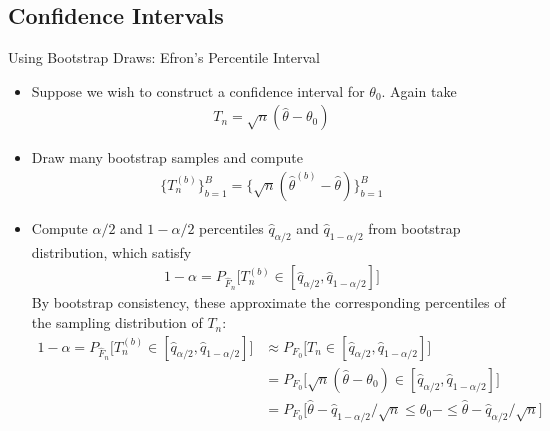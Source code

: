 \documentclass[aspectratio=169, handout]{beamer}
\begin{document}
\subsection{Confidence Intervals}


{\scriptsize
\begin{frame}{Using Bootstrap Draws: Efron's Percentile Interval}
\begin{itemize}
  \item
    Suppose we wish to construct a confidence interval for $\theta_0$.
    Again take
    \begin{align*}
      T_n = \sqrt{n}(\hat{\theta}-\theta_0)
    \end{align*}

  \item Draw many bootstrap samples and compute
    \begin{align*}
      \big\{T^{(b)}_n\big\}_{b=1}^B
      =
      \big\{\sqrt{n}(\hat{\theta}^{(b)}-\hat{\theta})\}_{b=1}^B
    \end{align*}
  \item Compute $\alpha/2$ and $1-\alpha/2$ percentiles
    $\hat{q}_{\alpha/2}$ and $\hat{q}_{1-\alpha/2}$ from bootstrap
    distribution, which satisfy
    \begin{align*}
      1-\alpha
      =
      P_{\hat{F}_n}
      \bigg[
        T_n^{(b)}\in [\hat{q}_{\alpha/2},\hat{q}_{1-\alpha/2}]
      \bigg]
    \end{align*}
    By bootstrap consistency, these approximate the corresponding
    percentiles of the sampling distribution of $T_n$:
    \begin{align*}
      1-\alpha
      =
      P_{\hat{F}_n}
      \bigg[
        T_n^{(b)}\in [\hat{q}_{\alpha/2},\hat{q}_{1-\alpha/2}]
      \bigg]
      &\approx
      P_{F_0}
      \bigg[
        T_n\in [\hat{q}_{\alpha/2},\hat{q}_{1-\alpha/2}]
      \bigg]
      \\
      &=
      P_{F_0}
      \bigg[
        \sqrt{n}(\hat{\theta}-\theta_0)
        \in [\hat{q}_{\alpha/2},\hat{q}_{1-\alpha/2}]
      \bigg]
      \\
      &=
      P_{F_0}
      \bigg[
        \hat{\theta}
        -
        \hat{q}_{1-\alpha/2}/\sqrt{n}
        \leq
        \theta_0-
        \leq
        \hat{\theta}
        -
        \hat{q}_{\alpha/2}/\sqrt{n}
      \bigg]
    \end{align*}

\end{itemize}
\end{frame}
}
\end{document}
